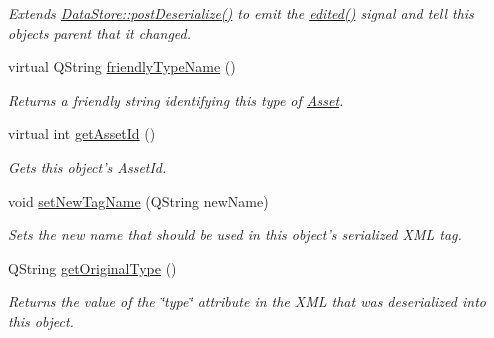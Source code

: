 \begin{DoxyCompactItemize}
\begin{DoxyCompactList}\small\item\em Extends \hyperlink{class_picto_1_1_data_store_aaa194a5392d79cefe701c163564efd52}{Data\-Store\-::post\-Deserialize()} to emit the \hyperlink{class_picto_1_1_asset_a2ca6303bf64730a9994a180bf2227da4}{edited()} signal and tell this objects parent that it changed. \end{DoxyCompactList}\item 
virtual Q\-String \hyperlink{class_picto_1_1_obsolete_name_asset_a9a825d957e6a0ec13fe3fcfa89f4a235}{friendly\-Type\-Name} ()
\begin{DoxyCompactList}\small\item\em Returns a friendly string identifying this type of \hyperlink{class_picto_1_1_asset}{Asset}. \end{DoxyCompactList}\item 
\hypertarget{class_picto_1_1_obsolete_name_asset_a7804bff1f7092b0185434fe60cee0c01}{virtual int \hyperlink{class_picto_1_1_obsolete_name_asset_a7804bff1f7092b0185434fe60cee0c01}{get\-Asset\-Id} ()}\label{class_picto_1_1_obsolete_name_asset_a7804bff1f7092b0185434fe60cee0c01}

\begin{DoxyCompactList}\small\item\em Gets this object's Asset\-Id. \end{DoxyCompactList}\item 
\hypertarget{class_picto_1_1_obsolete_name_asset_aca62d0a7a2e27330ed5c3b406c4a8301}{void \hyperlink{class_picto_1_1_obsolete_name_asset_aca62d0a7a2e27330ed5c3b406c4a8301}{set\-New\-Tag\-Name} (Q\-String new\-Name)}\label{class_picto_1_1_obsolete_name_asset_aca62d0a7a2e27330ed5c3b406c4a8301}

\begin{DoxyCompactList}\small\item\em Sets the new name that should be used in this object's serialized X\-M\-L tag. \end{DoxyCompactList}\item 
\hypertarget{class_picto_1_1_obsolete_name_asset_a59ed6b3d182d7f8be81f43c512d369da}{Q\-String \hyperlink{class_picto_1_1_obsolete_name_asset_a59ed6b3d182d7f8be81f43c512d369da}{get\-Original\-Type} ()}\label{class_picto_1_1_obsolete_name_asset_a59ed6b3d182d7f8be81f43c512d369da}

\begin{DoxyCompactList}\small\item\em Returns the value of the \char`\"{}type\char`\"{} attribute in the X\-M\-L that was deserialized into this object. \end{DoxyCompactList}\end{DoxyCompactItemize}
